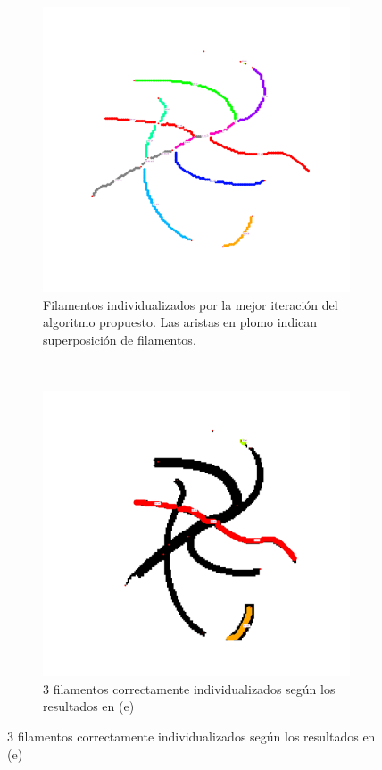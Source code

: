 \begin{figure}[h!]
    \begin{subfigure}[t]{0.49\textwidth}
        \centering
        \includegraphics[scale=0.11]{resultImages/define-weighted-4-phil-s0-v05-nobg-antLabeled.png}
        \caption{Filamentos individualizados por la mejor iteraci\'on del algoritmo propuesto. Las aristas en plomo indican superposici\'on de filamentos.}
        \label{fig:SynthDefine-Individualizacion}
    \end{subfigure}
    ~
    \begin{subfigure}[t]{0.49\textwidth}
        \centering
        \includegraphics[scale=0.11]{resultImages/define-weighted-4-phil-s0-v05-exactMatch-antLabeled.png}
        \caption{3 filamentos correctamente individualizados seg\'un los resultados en (e)}
        \label{fig:SynthDefine-Individualizacion-Best}
    \end{subfigure}
    

\end{figure}
